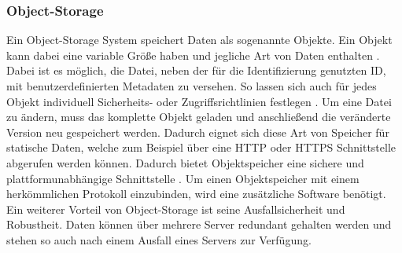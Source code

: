 \subsubsection{Object-Storage}
Ein Object-Storage System speichert Daten als sogenannte Objekte. Ein Objekt kann dabei eine variable Größe haben und jegliche Art von Daten enthalten \cite{ Mesnier2003StorageStorage}. Dabei ist es möglich, die Datei, neben der für die Identifizierung genutzten ID, mit benutzerdefinierten Metadaten zu versehen. So lassen sich auch für jedes Objekt individuell Sicherheits- oder Zugriffsrichtlinien festlegen \cite{ Mesnier2003StorageStorage}. Um eine Datei zu ändern, muss das komplette Objekt geladen und anschließend die veränderte Version neu gespeichert werden. Dadurch eignet sich diese Art von Speicher für statische Daten, welche zum Beispiel über eine \ac{HTTP} oder \ac{HTTPS} Schnittstelle abgerufen werden können. Dadurch bietet Objektspeicher eine sichere und plattformunabhängige Schnittstelle \cite{ Mesnier2003StorageStorage}. Um einen Objektspeicher mit einem herkömmlichen Protokoll einzubinden, wird eine zusätzliche Software benötigt.
Ein weiterer Vorteil von Object-Storage ist seine Ausfallsicherheit und Robustheit. Daten können über mehrere Server redundant gehalten werden und stehen so auch nach einem Ausfall eines Servers zur Verfügung.


